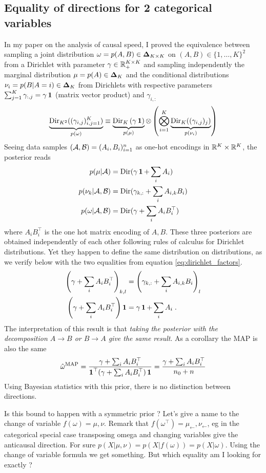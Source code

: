 \documentclass{article}
\newcommand{\Dir}{\mathrm{Dir}} %
\begin{document}
\subsection{Equality of directions for 2 categorical variables}
In my paper on the analysis of causal speed, I proved the equivalence between sampling a joint distribution $\omega = p(A,B) \in \bm{\Delta}_{K\times K}$ on $(A,B)\in \{1,\dots,K\}^2$ from a Dirichlet with parameter $\gamma\in \mathbb{R}_+^{K\times K}$ and sampling independently the marginal distribution $\mu = p(A)\in \bm{\Delta}_K$ and the conditional distributions $\nu_i = p(B|A=i)\in\bm{\Delta}_K$ from Dirichlets with respective parameters $\sum_{j=1}^K \gamma_{:,j} = \gamma \operatorname{\mathbf{1}}$ (matrix vector product) and $\gamma_{i,:}$
\begin{align}
    \underbrace{\Dir_{K^2}((\gamma_{i,j})_{i,j=1}^K) }_{p(\omega)}
    \equiv 
    \underbrace{\Dir_K\left( \gamma \ones \right)}_{p(\mu)} 
    \otimes \left (\bigotimes_{i=1}^K 
    \underbrace{\Dir_K((\gamma_{i,j})_j)}_{p(\nu_i)} 
    \right ) 
    \label{eq:dirichlet_factors}
\end{align}
Seeing data samples $({\mathcal A},{\mathcal B}) = (A_i,B_i)_{i=1}^n$ as one-hot encodings in $\mathbb{R}^K\times \mathbb{R}^K$, the posterior reads
\begin{align}
p(\mu|\cA) &= \Dir(\gamma\ones + \sum_i A_i)\\
p(\nu_k|\cA,\cB) &= \Dir(\gamma_{k,:} + \sum_i  A_{i,k} B_i ) \\
p(\omega | \cA,\cB) & = \Dir( \gamma + \sum_i A_i B_i^\top )  
\end{align}
where $A_i B_i^\top$ is the one hot matrix encoding of $A,B$.
These three posteriors are obtained independently of each other following rules of calculus for Dirichlet distributions. Yet they happen to define the same distribution on distributions, as we verify below with the two equalities from equation \eqref{eq:dirichlet_factors}.
\begin{align}
    \left(\gamma + \sum_i A_i B_i^\top \right)_{k,l} 
    &= \left(\gamma_{k,:} + \sum_i  A_{i,k} B_i \right)_l \\
    \left(\gamma + \sum_i A_i B_i^\top \right) \operatorname{\mathbf{1}} 
    &= \gamma \operatorname{\mathbf{1}} + \sum_i A_i \; .
\end{align}
The interpretation of this result is that \emph{taking the posterior with the decomposition $A\rightarrow B$ or $B\rightarrow A$ give the same result}. As a corollary the MAP is also the same
\begin{align}
\hat \omega^\text{MAP} 
= \frac{\gamma + \sum_i A_i B_i^\top}{\operatorname{\mathbf{1}}^\top (\gamma + \sum_i A_i B_i^\top) \operatorname{\mathbf{1}}}
=\frac{\gamma + \sum_i A_i B_i^\top}{n_0 + n}
\end{align}
Using Bayesian statistics with this prior, there is no distinction between directions.

Is this bound to happen with a symmetric prior ? Let's give a name to the change of variable $f(\omega) = \mu,\nu$. 
Remark that $f(\omega^\top) = \mu_\leftarrow, \nu_\leftarrow$, eg in the categorical special case transposing omega and changing variables give the anticausal direction. 
For sure  $p(X|\mu,\nu) = p(X|f(\omega)) = p(X|\omega)$. 
Using the change of variable formula  we get something.
But which equality am I looking for exactly ? 
\end{document}
